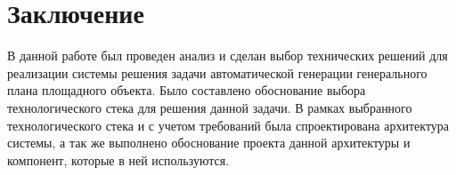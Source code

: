 \section*{\Large{Заключение}}
В данной работе был проведен анализ и сделан выбор технических решений для реализации системы
решения задачи автоматической генерации генерального плана площадного объекта.
Было составлено обоснование выбора технологического стека для решения данной задачи.
В рамках выбранного технологического стека и с учетом требований была спроектирована архитектура системы,
а так же выполнено обоснование проекта данной архитектуры и компонент, которые в ней используются.